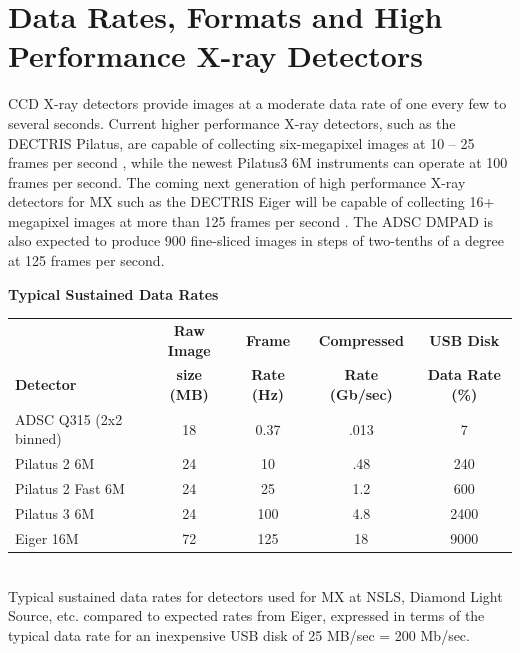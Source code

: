 \documentclass[11pt]{a0poster}
\begin{document}
\begin{minipage}[]{0.29\linewidth}
\section*{Data Rates, Formats and High Performance X-ray Detectors}

\fontsize{18}{22}\selectfont%
CCD X-ray detectors provide images at a moderate data rate of one every
few to several seconds. Current higher performance X-ray detectors, such as the DECTRIS Pilatus,
are capable of collecting six-megapixel images at 10 -- 25 frames per
second \cite{Trueb2012}, while the newest Pilatus3 6M instruments can
operate at 100 frames per second. The coming next generation of high performance 
X-ray detectors for MX such as the DECTRIS Eiger will be capable of collecting
16+ megapixel images at more than 125 frames per second \cite[page 6]{Willmott2011} \cite{Johnson2012}.
The ADSC DMPAD \cite{Hamlin2012} is also expected
to produce 900 fine-sliced images in steps of two-tenths of a degree
at 125 frames per second.
\vspace{-2mm}

\begin{center}
{\fontsize{20}{24}\selectfont%
 \bf Typical Sustained Data Rates}
\begin{tabular}{lcccc}
\hline
         & {\bf Raw Image}& {\bf Frame}& {\bf Compressed} & {\bf USB Disk}\\
{\bf Detector }& {\bf size (MB) }&{\bf Rate (Hz) }& {\bf Rate (Gb/sec)}& {\bf Data Rate (\%)}\\
\hline
ADSC Q315 (2x2 binned) & 18 & 0.37 & .013 & 7 \\
Pilatus 2 6M      & 24 & 10 & .48 & 240\\
Pilatus 2 Fast 6M & 24 & 25 & 1.2 & 600\\
Pilatus 3 6M      & 24 & 100 & 4.8 & 2400\\
Eiger 16M         & 72 & 125 & 18& 9000 \\
\hline
\end{tabular}
{\fontsize{16}{20}\selectfont%
\vspace{1mm}\\
Typical sustained data rates for detectors used for MX at NSLS, Diamond Light
Source, etc. compared to expected rates from Eiger, expressed in terms of the 
typical data rate for an inexpensive
USB disk of 25 MB/sec = 200 Mb/sec.} 
\end{center}
\vspace{-2mm}


\end{minipage}
\end{document}
